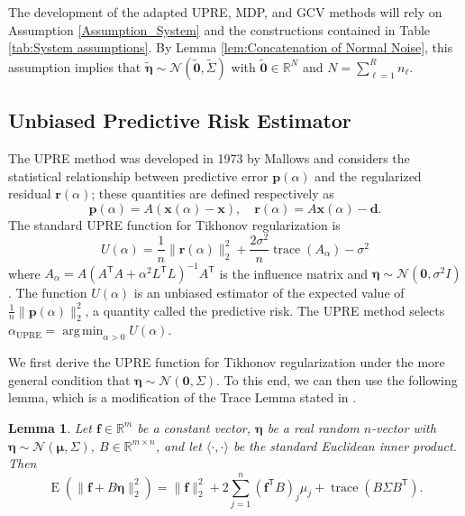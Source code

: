 \documentclass[12pt]{article}
\newcommand{\dVec}{\mathbf{d}}	%
\newcommand{\pVec}{\mathbf{p}}	%
\newcommand{\rVec}{\mathbf{r}}	%
\newcommand{\fVec}{\mathbf{f}}	%
\newcommand{\xVec}{\mathbf{x}}	%
\newcommand{\trans}[1]{{#1}^\mathsf{T}}	%
\DeclareMathOperator{\trace}{trace}		%
\newcommand{\regparam}{\alpha}
\newcommand{\xReg}{\xVec(\regparam)}	%
\newcommand{\xSol}{\xVec}	%
\DeclareMathOperator*{\argmin}{arg\,min}
\newcommand{\noise}{\eta}	%
\newcommand{\noiseSD}{\sigma}	%
\newcommand{\noiseVec}{\bm{\noise}}	%
\DeclareMathOperator{\E}{E}	%
\newcommand{\zeroVec}{\bm{0}}	%
\newcommand{\A}{A_{\regparam}}	%
\newcommand{\U}{U}	%
\newtheorem{lemma}{Lemma}[section]
\begin{document}
The development of the adapted UPRE, MDP, and GCV methods will rely on Assumption \ref{Assumption_System} and the constructions contained in Table \ref{tab:System assumptions}. By Lemma \ref{lem:Concatenation of Normal Noise}, this assumption implies that $\widetilde{\noiseVec} \sim \mathcal{N}\left(\widetilde{\zeroVec},\widetilde{\Sigma}\right)$ with $\widetilde{\zeroVec} \in \mathbb{R}^N$ and $N = \sum_{\ell=1}^{R} n_\ell$. 

\subsection{Unbiased Predictive Risk Estimator} \label{sec:UPRE}
The UPRE method was developed in 1973 by Mallows and considers the statistical relationship between predictive error $\pVec(\regparam)$ and the regularized residual $\rVec(\regparam)$; these quantities are defined respectively as
\begin{equation}
\label{eq:Predictive Error and Regularized Residual}
\pVec(\regparam) = A(\xReg - \xSol), \quad \rVec(\regparam) = A\xReg - \dVec.
\end{equation}
The standard UPRE function for Tikhonov regularization is
\begin{equation}
\label{eq:UPRE}
\U(\alpha) = \frac{1}{n}\|\rVec(\regparam)\|_2^2 + \frac{2\noiseSD^2}{n}\trace(A_\regparam) - \noiseSD^2
\end{equation}
where $\A = A(\trans{A}A + \regparam^2\trans{L}L)^{-1}\trans{A}$ is the influence matrix and $\noiseVec \sim \mathcal{N}(\bm{0},\noiseSD^2I)$. The function $\U(\regparam)$ is an unbiased estimator of the expected value of $\frac{1}{n}\|\pVec(\regparam)\|_2^2$, a quantity called the predictive risk. The UPRE method selects $\regparam_{\textrm{UPRE}} = \argmin_{\regparam > 0} \U(\regparam)$. \par
We first derive the UPRE function for Tikhonov regularization under the more general condition that $\noiseVec \sim \mathcal{N}(\bm{0},\Sigma)$. To this end, we can then use the following lemma, which is a modification of the Trace Lemma stated in \cite[p.~98]{Vogel:2002}.
\begin{lemma}
\label{lem:Generalized Trace Lemma}
Let $\fVec \in \mathbb{R}^m$ be a constant vector, $\noiseVec$ be a real random $n$-vector with $\noiseVec \sim \mathcal{N}(\bm{\mu},\Sigma)$, $B \in \mathbb{R}^{m \times n}$, and let $\langle \cdot,\cdot \rangle$ be the standard Euclidean inner product. Then
\[\E(\|\fVec + B\noiseVec\|_2^2) = \|\fVec\|_2^2 + 2\sum_{j=1}^{n} (\trans{\fVec}B)_j \mu_j + \trace\left(B\Sigma\trans{B}\right).\]
\end{lemma}
\end{document}
